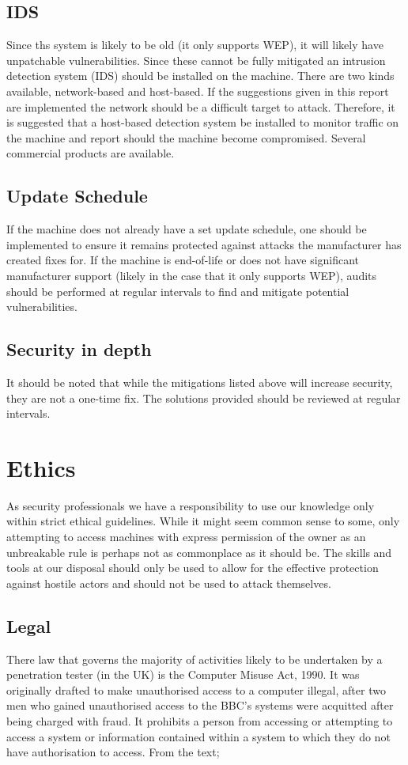 \documentclass[12pt]{article}
\begin{document}
\subsection{IDS}
Since ths system is likely to be old (it only supports WEP), it will likely have unpatchable vulnerabilities. Since these cannot be fully mitigated an intrusion detection system (IDS) should be installed on the machine. There are two kinds available, network-based and host-based. If the suggestions given in this report are implemented the network should be a difficult target to attack. Therefore, it is suggested that a host-based detection system be installed to monitor traffic on the machine and report should the machine become compromised. Several commercial products are available. 

\subsection{Update Schedule}
If the machine does not already have a set update schedule, one should be implemented to ensure it remains protected against attacks the manufacturer has created fixes for. If the machine is end-of-life or does not have significant manufacturer support (likely in the case that it only supports WEP), audits should be performed at regular intervals to find and mitigate potential vulnerabilities.

\subsection{Security in depth}
It should be noted that while the mitigations listed above will increase security, they are not a one-time fix. The solutions provided should be reviewed at regular intervals.

\newpage
\section{Ethics}
As security professionals we have a responsibility to use our knowledge only within strict ethical guidelines. While it might seem common sense to some, only attempting to access machines with express permission of the owner as an unbreakable rule is perhaps not as commonplace as it should be. The skills and tools at our disposal should only be used to allow for the effective protection against hostile actors and should not be used to attack themselves.

\subsection{Legal}
There law that governs the majority of activities likely to be undertaken by a penetration tester (in the UK) is the Computer Misuse Act, 1990. It was originally drafted to make unauthorised access to a computer illegal, after two men who gained unauthorised access to the BBC's systems were acquitted after being charged with fraud. It prohibits a person from accessing or attempting to access a system or information contained within a system to which they do not have authorisation to access. From the text;
\end{document}
